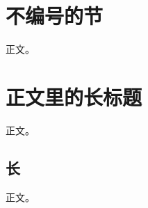 \documentclass{article}
\begin{document}
\section*{不编号的节}
正文。
\section[目录里的短标题]{正文里的长标题}
正文。
\subsection*[短]{长}
正文。
\end{document}
